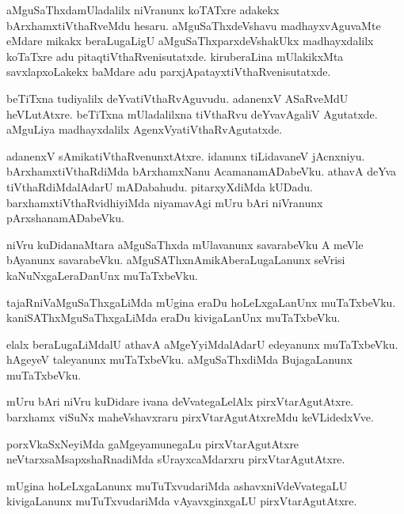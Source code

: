 \documentclass{article}
\begin{document}
\begin{mn}
aMguSaThxdamUladalilx niVranunx koTATxre adakekx bArxhamxtiVthaRveMdu hesaru. aMguSaThxdeVshavu 
madhayxvAguvaMte eMdare mikakx beraLugaLigU aMguSaThxparxdeVshakUkx madhayxdalilx koTaTxre adu 
pitaqtiVthaRvenisutatxde. kiruberaLina mUlakikxMta savxlapxoLakekx baMdare adu 
parxjApatayxtiVthaRvenisutatxde.
\end{mn}

\begin{mn}
beTiTxna tudiyalilx deYvatiVthaRvAguvudu. adanenxV  ASaRveMdU heVLutAtxre. beTiTxna mUladalilxna
tiVthaRvu deYvavAgaliV Agutatxde. aMguLiya madhayxdalilx AgenxVyatiVthaRvAgutatxde.
\end{mn}

\begin{mn}
adanenxV sAmikatiVthaRvenunxtAtxre. idanunx tiLidavaneV jAcnxniyu. bArxhamxtiVthaRdiMda 
bArxhamxNanu AcamanamADabeVku. athavA deYva tiVthaRdiMdalAdarU mADabahudu. pitarxyXdiMda kUDadu. 
barxhamxtiVthaRvidhiyiMda niyamavAgi mUru bAri niVranunx pArxshanamADabeVku.
\end{mn}

\begin{mn}
niVru kuDidanaMtara aMguSaThxda mUlavanunx savarabeVku A meVle bAyanunx savarabeVku. 
aMguSAThxnAmikAberaLugaLanunx seVrisi kaNuNxgaLeraDanUnx muTaTxbeVku.
\end{mn}

\begin{mn}
tajaRniVaMguSaThxgaLiMda mUgina eraDu hoLeLxgaLanUnx muTaTxbeVku. kaniSAThxMguSaThxgaLiMda eraDu 
kivigaLanUnx muTaTxbeVku.
\end{mn}

\begin{mn}
elalx beraLugaLiMdalU athavA aMgeYyiMdalAdarU edeyanunx muTaTxbeVku. hAgeyeV taleyanunx 
muTaTxbeVku. aMguSaThxdiMda BujagaLanunx muTaTxbeVku.
\end{mn}

\begin{mn}
mUru bAri niVru kuDidare ivana deVvategaLelAlx pirxVtarAgutAtxre. barxhamx viSuNx maheVshavxraru 
pirxVtarAgutAtxreMdu keVLidedxVve.
\end{mn}

\begin{mn}
porxVkaSxNeyiMda gaMgeyamunegaLu pirxVtarAgutAtxre neVtarxsaMsapxshaRnadiMda sUrayxcaMdarxru 
pirxVtarAgutAtxre.
\end{mn}

\begin{mn}
mUgina hoLeLxgaLanunx muTuTxvudariMda ashavxniVdeVvategaLU kivigaLanunx muTuTxvudariMda 
vAyavxginxgaLU pirxVtarAgutAtxre.
\end{mn}
\end{document}
